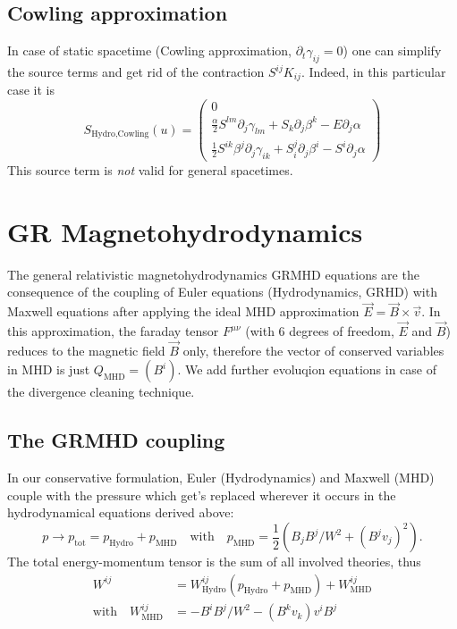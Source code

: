 \documentclass[a4paper]{article}
\newcommand{\desc}[1]{\text{#1}\quad}
\newcommand{\hydro}{\text{Hydro}}
\newcommand{\mhd}{\text{MHD}}
\begin{document}
\subsection{Cowling approximation}
In case of static spacetime (Cowling approximation,
$\partial_t \gamma_{ij} = 0$) one can simplify the source terms and
get rid of the contraction $S^{ij}K_{ij}$. Indeed, in this particular
case it is
\begin{equation}
S_{\hydro\text{,Cowling}}(u) =
\begin{pmatrix}
0
\\
\frac \alpha2 S^{lm} \partial_j \gamma_{lm} + S_k \partial_j \beta^k - E \partial_j \alpha
\\
\frac 12 S^{ik} \beta^j \partial_j \gamma_{ik} + S^j_i \partial_j \beta^i - S^i \partial_j \alpha
\end{pmatrix}
\end{equation}
This source term is \emph{not} valid for general spacetimes.

\section{GR Magnetohydrodynamics}

The general relativistic magnetohydrodynamics GRMHD equations are
the consequence of the coupling of Euler equations 
(Hydrodynamics, GRHD) with Maxwell equations after applying the ideal MHD
approximation $\vec E = \vec B \times \vec v$. In this approximation,
the faraday tensor $F^{\mu\nu}$ (with 6 degrees of freedom, $\vec E$ 
and $\vec B$) reduces to the magnetic field $\vec B$ only, therefore the
vector of conserved variables in MHD is just $Q_\mhd = (B^i)$. We add
further evoluqion equations in case of the divergence cleaning technique.

\subsection{The GRMHD coupling}
In our conservative formulation, Euler (Hydrodynamics) and Maxwell (MHD)
couple with the pressure which get's replaced wherever it occurs in the
hydrodynamical equations derived above:
\begin{equation}
p \to p_\text{tot} = p_\hydro + p_\mhd
\quad\text{with}\quad
p_\mhd = \frac 12 \left( B_j B^j / W^2 + (B^j v_j)^2 \right).
\end{equation}
The total energy-momentum tensor is the sum of all involved theories,
thus
\begin{align}
W^{ij} &= W^{ij}_\hydro(p_\hydro + p_\mhd) + W^{ij}_\mhd
\\
\desc{with} W^{ij}_\mhd &= - B^i B^j / W^2 - (B^k v_k) v^i B^j
\end{align}
\end{document}
